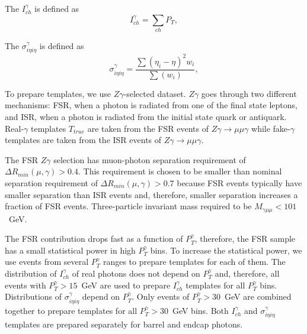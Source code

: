 The $I_{ch}^{\gamma}$ is defined as
\begin{equation}
  I_{ch}^{\gamma} = \sum_{ch} P_T,
\end{equation} 

The $\sigma_{i\eta i\eta}^{\gamma}$ is defined as
\begin{equation}
  \sigma_{i\eta i\eta}^{\gamma} = \frac{\sum{(\eta_i-\eta)^2 w_i}}{\sum(w_i)},
\end{equation}

To prepare templates, we use $Z\gamma$-selected dataset. $Z\gamma$ goes through two different mechanisms: FSR, when a photon is radiated from one of the final state leptons, and ISR, when a photon is radiated from the initial state quark or antiquark. Real-$\gamma$ templates $T_{true}$ are taken from the FSR events of $Z\gamma\rightarrow\mu\mu\gamma$ while fake-$\gamma$ templates are taken from the ISR events of $Z\gamma\rightarrow\mu\mu\gamma$.

The FSR $Z\gamma$ selection has muon-photon separation requirement of $\Delta R_{min}(\mu,\gamma)>0.4$. This requirement is chosen to be smaller than nominal separation requirement of $\Delta R_{min}(\mu,\gamma)>0.7$ because FSR events typically have smaller separation than ISR events and, therefore, smaller separation increases a fraction of FSR events. Three-particle invariant mass required to be $M_{\gamma\mu\mu}<101$~GeV. 

The FSR contribution drops fast as a function of $P_{T}^{\gamma}$, therefore, the FSR sample has a small statistical power in high $P_{T}^{\gamma}$ bins. To increase the statistical power, we use events from several $P_T^{\gamma}$ ranges to prepare templates for each of them. The distribution of $I_{ch}^{\gamma}$ of real photons does not depend on $P_{T}^{\gamma}$ and, therefore, all events with $P_{T}^{\gamma}>15$~GeV are used to prepare $I_{ch}^{\gamma}$ templates for all $P_T^{\gamma}$ bins. Distributions of $\sigma_{i\eta i\eta}^{\gamma}$ depend on $P_T^{\gamma}$. Only events of $P_T^{\gamma}>30$~GeV are combined together to prepare templates for all $P_T^{\gamma}>30$~GeV bins. Both $I_{ch}^{\gamma}$ and $\sigma_{i\eta i\eta}^{\gamma}$ templates are prepared separately for barrel and endcap photons.

